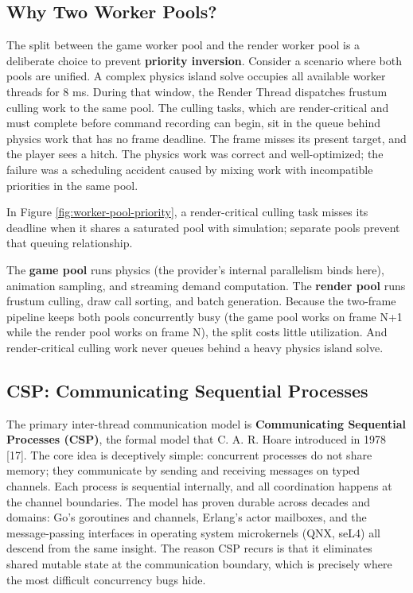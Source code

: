 \documentclass[
  11pt,
  letterpaper,
  DIV=11,
  numbers=noendperiod,
  twoside,
  open=right]{scrreprt}
\begin{document}
\subsection{Why Two Worker Pools?}\label{why-two-worker-pools}

The split between the game worker pool and the render worker pool is a
deliberate choice to prevent \textbf{priority inversion}. Consider a
scenario where both pools are unified. A complex physics island solve
occupies all available worker threads for 8 ms. During that window, the
Render Thread dispatches frustum culling work to the same pool. The
culling tasks, which are render-critical and must complete before
command recording can begin, sit in the queue behind physics work that
has no frame deadline. The frame misses its present target, and the
player sees a hitch. The physics work was correct and well-optimized;
the failure was a scheduling accident caused by mixing work with
incompatible priorities in the same pool.

In Figure \ref{fig:worker-pool-priority}, a render-critical culling task
misses its deadline when it shares a saturated pool with simulation;
separate pools prevent that queuing relationship.



The \textbf{game pool} runs physics (the provider's internal parallelism
binds here), animation sampling, and streaming demand computation. The
\textbf{render pool} runs frustum culling, draw call sorting, and batch
generation. Because the two-frame pipeline keeps both pools concurrently
busy (the game pool works on frame N+1 while the render pool works on
frame N), the split costs little utilization. And render-critical
culling work never queues behind a heavy physics island solve.

\subsection{CSP: Communicating Sequential
Processes}\label{csp-communicating-sequential-processes}

The primary inter-thread communication model is \textbf{Communicating
Sequential Processes (CSP)}, the formal model that C. A. R. Hoare
introduced in 1978 {[}17{]}. The core idea is deceptively simple:
concurrent processes do not share memory; they communicate by sending
and receiving messages on typed channels. Each process is sequential
internally, and all coordination happens at the channel boundaries. The
model has proven durable across decades and domains: Go's goroutines and
channels, Erlang's actor mailboxes, and the message-passing interfaces
in operating system microkernels (QNX, seL4) all descend from the same
insight. The reason CSP recurs is that it eliminates shared mutable
state at the communication boundary, which is precisely where the most
difficult concurrency bugs hide.
\end{document}
